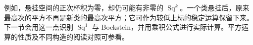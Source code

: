 例如，悬挂空间的正次杯积为零，却仍可能有非零的 \(\operatorname{Sq}^k\)。一个类悬挂后，原来最高次的平方不再是新类的最高次平方；它可作为较低上标的稳定运算保留下来。下一节会用这一点识别 \(\operatorname{Sq}^1\) 与 Bockstein，并用乘积公式进行实际计算。平方运算的性质及不同构造的阅读对照可参看\cite[第4.L节，Steenrod Squares and Powers]{Hatcher2002}。
